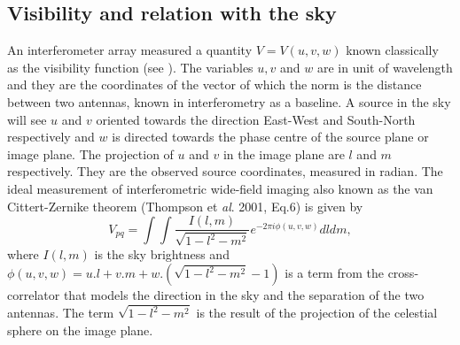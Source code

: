 \documentclass[useAMS,usenatbib]{mn2e}
\begin{document}
\subsection{Visibility and relation with the sky }
\label{sec:visSky}
An interferometer array measured a quantity $V=V(u,v,w)$ known classically as the visibility function (see \cite{5}).
The variables $u,v$ and $w$ are in unit of wavelength and they are the coordinates of the vector of which the norm is the distance between 
two antennas, known in interferometry as a baseline. A source in the sky will see $u$ and $v$ oriented towards the direction East-West and 
South-North respectively and $w$ is directed towards the phase centre of the source plane or image plane. The projection of $u$ and $v$ in 
the image plane are $l$ and $m$ respectively. They are the observed source coordinates, measured in radian. The ideal measurement of 
interferometric wide-field imaging also known as the van Cittert-Zernike theorem (Thompson et \textit{al}. 2001, Eq.6) is given by
\begin{equation}
 V_{pq}=\int \int \frac{I(l,m)}{\sqrt{1-l^2 - m^2}}e^{-2\pi i \phi (u,v,w)}dldm, \label{eq1:visSky}
\end{equation} 
where $I(l,m)$ is the sky brightness and $\phi(u,v,w)=u.l+v.m+w.(\sqrt{1-l^2 - m^2}-1)$ is a term from the cross-correlator that models the 
direction in the sky and the separation of the two antennas. The term $\sqrt{1-l^2 - m^2}$ is the result of the projection of the celestial 
sphere on the image plane.
% 
\end{document}
